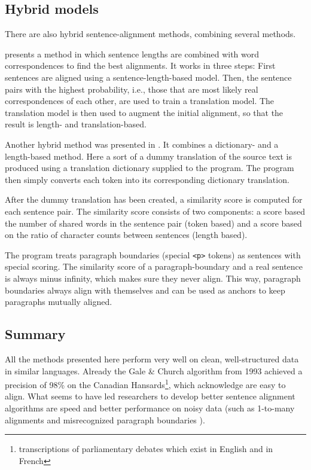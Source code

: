 \subsection{Hybrid models}
There are also hybrid sentence-alignment methods, combining several methods.


\cite{moore2002fast} presents a method in which sentence lengths are combined with word correspondences to find the best alignments. 
It works in three steps:
First sentences are aligned using a sentence-length-based model. 
Then, the sentence pairs with the highest probability, i.e., those that are most likely real correspondences of each other, are used to train a translation model. 
The translation model is then used to augment the initial alignment, so that the result is length- and translation-based.

Another hybrid method was presented in \cite{hunalign}. 
It combines a dictionary- and a length-based method.
Here a sort of a dummy translation of the source text is produced using a translation dictionary supplied to the program. 
The program then simply converts each token into its corresponding dictionary translation.

After the dummy translation has been created, a similarity score is computed for each sentence pair.
The similarity score consists of two components: a score based the number of shared words in the sentence pair (token based) and  a score based on the ratio of character counts between sentences (length based). 

The program treats paragraph boundaries (special \texttt{<p>} tokens) as sentences with special scoring. 
The similarity score of a paragraph-boundary  and a real sentence is always minus infinity, which makes sure they never align. This way, paragraph boundaries always align with themselves and can be used as anchors to keep  paragraphs mutually aligned.

\subsection{Summary}
All the methods presented here perform very well on clean, well-structured data in similar languages. Already the Gale \& Church algorithm from 1993 achieved a precision of 98\% on the Canadian Hansards\footnote{transcriptions of parliamentary debates which exist in English and in French}, which \citeauthor{gale-church-1991-program} acknowledge are easy to align. 
What seems to have led researchers to develop better sentence alignment algorithms are speed \autocites{chen-1993-aligning,hunalign} and better performance on noisy data (such as 1-to-many alignments and misrecognized paragraph boundaries \autocite{sennrich-volk-2010-mt}). 


